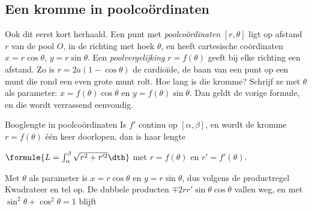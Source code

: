 
\begin{oefeningen}
\end{oefeningen}

\subsection{Een kromme in poolcoördinaten}

Ook dit eerst kort herhaald. Een punt met \textit{poolcoördinaten} $[r, \theta]$ ligt op afstand $r$ van de pool $O$, in de richting met hoek $\theta$, en heeft cartesische coördinaten $x = r\cos\theta$, $y = r\sin\theta$. Een \textit{poolvergelijking} $r = f(\theta)$ geeft bij elke richting een afstand. Zo is $r = 2a(1 - \cos\theta)$ de cardioïde, de baan van een punt op een munt die rond een even grote munt rolt. Hoe lang is die kromme? Schrijf ze met $\theta$ als parameter: $x = f(\theta)\cos\theta$ en $y = f(\theta)\sin\theta$. Dan geldt de vorige formule, en die wordt verrassend eenvoudig.

\begin{theorie}
\begin{stelling}{Booglengte in poolcoördinaten}
Is $f'$ continu op $[\alpha, \beta]$, en wordt de kromme $r = f(\theta)$ één keer doorlopen, dan is haar lengte

\vspace{1mm}
\qquad $\formule{L = \int_\alpha^\beta \sqrt{r^2 + r'^2}\dth}$ \qquad met $r = f(\theta)$ en $r' = f'(\theta)$.
\end{stelling}

\begin{bewijs}
Met $\theta$ als parameter is $x = r\cos\theta$ en $y = r\sin\theta$, dus volgens de productregel
Kwadrateer en tel op. De dubbele producten $\mp 2rr'\sin\theta\cos\theta$ vallen weg, en met $\sin^2\theta + \cos^2\theta = 1$ blijft
\end{bewijs}
\end{theorie}

